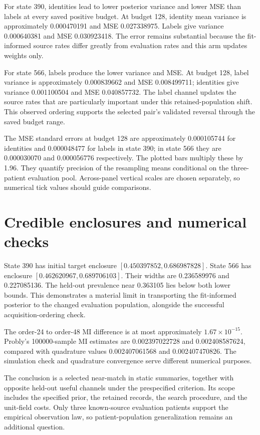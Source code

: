 \documentclass[11pt,a4paper]{report}
\begin{document}
For state 390, identities lead to lower posterior variance and lower MSE than labels at every saved positive budget. At budget 128, identity mean variance is approximately 0.000470191 and MSE 0.027338975. Labels give variance 0.000640381 and MSE 0.030923418. The error remains substantial because the fit-informed source rates differ greatly from evaluation rates and this arm updates weights only.

For state 566, labels produce the lower variance and MSE. At budget 128, label variance is approximately 0.000839662 and MSE 0.008499711; identities give variance 0.001100504 and MSE 0.040857732. The label channel updates the source rates that are particularly important under this retained-population shift. This observed ordering supports the selected pair's validated reversal through the saved budget range.

The MSE standard errors at budget 128 are approximately 0.000105744 for identities and 0.000048477 for labels in state 390; in state 566 they are 0.000030070 and 0.000056776 respectively. The plotted bars multiply these by 1.96. They quantify precision of the resampling means conditional on the three-patient evaluation pool. Across-panel vertical scales are chosen separately, so numerical tick values should guide comparisons.

\section{Credible enclosures and numerical checks}
State 390 has initial target enclosure $[0.450397852,0.686987828]$. State 566 has enclosure $[0.462620967,0.689706103]$. Their widths are 0.236589976 and 0.227085136. The held-out prevalence near 0.363105 lies below both lower bounds. This demonstrates a material limit in transporting the fit-informed posterior to the changed evaluation population, alongside the successful acquisition-ordering check.

The order-24 to order-48 MI difference is at most approximately $1.67\times10^{-15}$. Probly's 100000-sample MI estimates are 0.002397022728 and 0.002408587624, compared with quadrature values 0.002407061568 and 0.002407470826. The simulation check and quadrature convergence serve different numerical purposes.

The conclusion is a selected near-match in static summaries, together with opposite held-out useful channels under the prespecified criterion. Its scope includes the specified prior, the retained records, the search procedure, and the unit-field costs. Only three known-source evaluation patients support the empirical observation law, so patient-population generalization remains an additional question.
\end{document}
